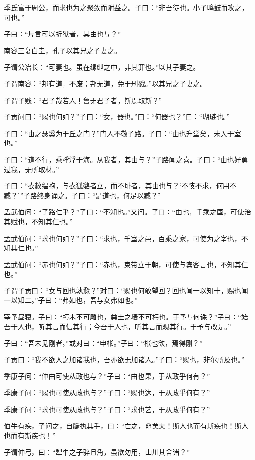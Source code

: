 \documentclass[a5paper]{ctexbook}
\begin{document}
    季氏富于周公，而求也为之聚敛而附益之。子曰：“非吾徒也。小子鸣鼓而攻之，可也。”

    子曰：“片言可以折狱者，其由也与？”

    南容三复白圭，孔子以其兄之子妻之。

    子谓公冶长：“可妻也。虽在缧绁之中，非其罪也。”以其子妻之。

    子谓南容：“邦有道，不废；邦无道，免于刑戮。”以其兄之子妻之。

    子谓子贱：“君子哉若人！鲁无君子者，斯焉取斯？”

    子贡问曰：“赐也何如？”子曰：“女，器也。”曰：“何器也？”曰：“瑚琏也。”

    子曰：“由之瑟奚为于丘之门？”门人不敬子路。子曰：“由也升堂矣，未入于室也。”

    子曰：“道不行，乘桴浮于海。从我者，其由与？”子路闻之喜。子曰：“由也好勇过我，无所取材。”

    子曰：“衣敝缊袍，与衣狐貉者立，而不耻者，其由也与？‘不忮不求，何用不臧？’”子路终身诵之。子曰：“是道也，何足以臧？”

    孟武伯问：“子路仁乎？”子曰：“不知也。”又问。子曰：“由也，千乘之国，可使治其赋也，不知其仁也。”
    
    孟武伯问：“求也何如？”子曰：“求也，千室之邑，百乘之家，可使为之宰也，不知其仁也。”
    
    孟武伯问：“赤也何如？”子曰：“赤也，束带立于朝，可使与宾客言也，不知其仁也。”

    子谓子贡曰：“女与回也孰愈？”对曰：“赐也何敢望回？回也闻一以知十，赐也闻一以知二。”子曰：“弗如也，吾与女弗如也。”

    宰予昼寝。子曰：“朽木不可雕也，粪土之墙不可杇也。于予与何诛？”子曰：“始吾于人也，听其言而信其行；今吾于人也，听其言而观其行。于予与改是。”

    子曰：“吾未见刚者。”或对曰：“申枨。”子曰：“枨也欲，焉得刚？”

    子贡曰：“我不欲人之加诸我也，吾亦欲无加诸人。”子曰：“赐也，非尔所及也。”

    季康子问：“仲由可使从政也与？”子曰：“由也果，于从政乎何有？”
    
    季康子问：“赐也可使从政也与？”子曰：“赐也达，于从政乎何有？”
    
    季康子问：“求也可使从政也与？”子曰：“求也艺，于从政乎何有？”

    伯牛有疾，子问之，自牖执其手，曰：“亡之，命矣夫！斯人也而有斯疾也！斯人也而有斯疾也！”

    子谓仲弓，曰：“犁牛之子骍且角，虽欲勿用，山川其舍诸？”
\end{document}
